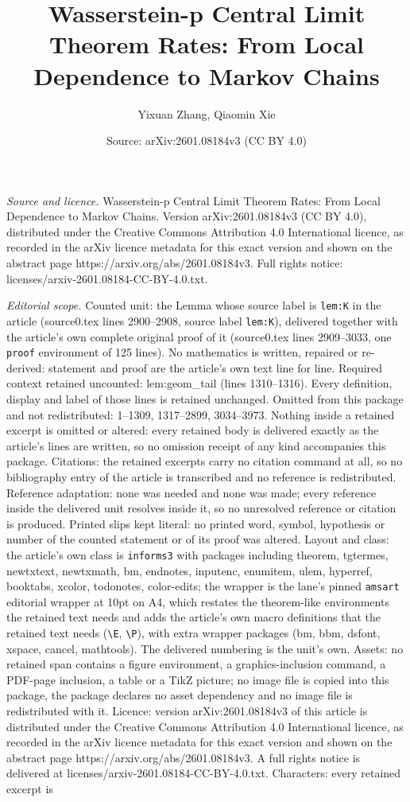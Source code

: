 \documentclass[10pt,a4paper]{amsart}
\title[Wasserstein-p Central Limit Theorem Rates: From Local Depend]{Wasserstein-p Central Limit Theorem Rates: From Local Dependence to Markov Chains}
\author{Yixuan Zhang, Qiaomin Xie}
\date{Source: arXiv:2601.08184v3 (CC BY 4.0)}
\begin{document}
\maketitle

\noindent\emph{Source and licence.} Wasserstein-p Central Limit Theorem Rates: From Local Dependence to Markov Chains. Version arXiv:2601.08184v3 (CC BY 4.0), distributed under the Creative Commons Attribution 4.0 International licence, as recorded in the arXiv licence metadata for this exact version and shown on the abstract page https://arxiv.org/abs/2601.08184v3. Full rights notice: licenses/arxiv-2601.08184-CC-BY-4.0.txt.\par\smallskip

\noindent\textit{Editorial scope.} Counted unit: the Lemma whose source label is \texttt{lem:K} in the article (source0.tex lines 2900--2908, source label \texttt{lem:K}), delivered together with the article's own complete original proof of it (source0.tex lines 2909--3033, one \texttt{proof} environment of 125 lines). No mathematics is written, repaired or re-derived: statement and proof are the article's own text line for line. Required context retained uncounted: lem:geom\_tail (lines 1310--1316). Every definition, display and label of those lines is retained unchanged. Omitted from this package and not redistributed: 1--1309, 1317--2899, 3034--3973. Nothing inside a retained excerpt is omitted or altered: every retained body is delivered exactly as the article's lines are written, so no omission receipt of any kind accompanies this package. Citations: the retained excerpts carry no citation command at all, so no bibliography entry of the article is transcribed and no reference is redistributed. Reference adaptation: none was needed and none was made; every reference inside the delivered unit resolves inside it, so no unresolved reference or citation is produced. Printed slips kept literal: no printed word, symbol, hypothesis or number of the counted statement or of its proof was altered. Layout and class: the article's own class is \texttt{informs3} with packages including theorem, tgtermes, newtxtext, newtxmath, bm, endnotes, inputenc, enumitem, ulem, hyperref, booktabs, xcolor, todonotes, color-edits; the wrapper is the lane's pinned \texttt{amsart} editorial wrapper at 10pt on A4, which restates the theorem-like environments the retained text needs and adds the article's own macro definitions that the retained text needs (\texttt{\textbackslash E}, \texttt{\textbackslash P}), with extra wrapper packages (bm, bbm, dsfont, xspace, cancel, mathtools). The delivered numbering is the unit's own. Assets: no retained span contains a figure environment, a graphics-inclusion command, a PDF-page inclusion, a table or a TikZ picture; no image file is copied into this package, the package declares no asset dependency and no image file is redistributed with it. Licence: version arXiv:2601.08184v3 of this article is distributed under the Creative Commons Attribution 4.0 International licence, as recorded in the arXiv licence metadata for this exact version and shown on the abstract page https://arxiv.org/abs/2601.08184v3. A full rights notice is delivered at licenses/arxiv-2601.08184-CC-BY-4.0.txt. Characters: every retained excerpt is 
\end{document}
